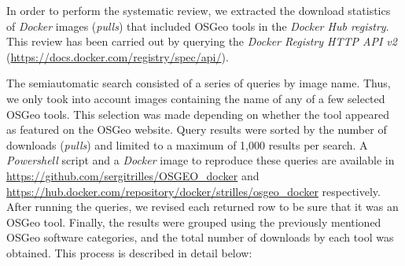 \documentclass[ijgi,article,submit,moreauthors,pdftex]{Definitions/mdpi}
\begin{document}
In order to perform the systematic review, we extracted the download statistics of \textit{Docker} images (\textit{pulls}) that included OSGeo tools in the \textit{Docker Hub registry}. This review has been carried out by querying the \textit{Docker Registry HTTP API v2} (\url{https://docs.docker.com/registry/spec/api/}).

The semiautomatic search consisted of a series of queries by image name. Thus, we only took into account images containing the name of any of a few selected OSGeo tools. This selection was made depending on whether the tool appeared as featured on the OSGeo website. Query results were sorted by the number of downloads (\textit{pulls}) and limited to a maximum of 1,000 results per search. A \textit{Powershell} script and a \textit{Docker} image to reproduce these queries are available in \url{https://github.com/sergitrilles/OSGEO\_docker} and \url{https://hub.docker.com/repository/docker/strilles/osgeo\_docker} respectively. After running the queries, we revised each returned row to be sure that it was an OSGeo tool. Finally, the results were grouped using the previously mentioned OSGeo software categories, and the total number of downloads by each tool was obtained. This process is described in detail below:
\end{document}
